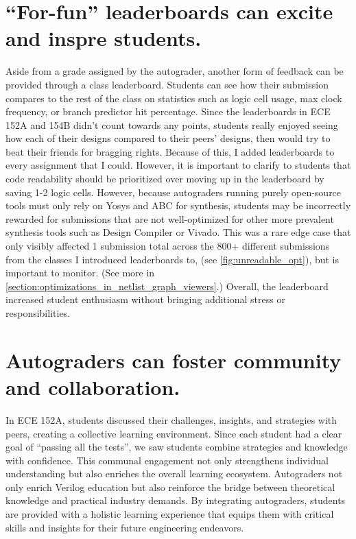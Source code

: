 \section{``For-fun'' leaderboards can excite and inspre students.}
\label{section:leaderboard}



Aside from a grade assigned by the autograder, another form of feedback can be provided through a class leaderboard. Students can see how their submission compares to the rest of the class on statistics such as logic cell usage, max clock frequency, or branch predictor hit percentage. Since the leaderboards in ECE 152A and 154B didn't count towards any points, students really enjoyed seeing how each of their designs compared to their peers' designs, then would try to beat their friends for bragging rights. Because of this, I added leaderboards to every assignment that I could. However, it is important to clarify to students that code readability should be prioritized over moving up in the leaderboard by saving 1-2 logic cells. However, because autograders running purely open-source tools must only rely on Yosys and ABC for synthesis, students may be incorrectly rewarded for submissions that are not well-optimized for other more prevalent synthesis tools such as Design Compiler or Vivado. This was a rare edge case that only visibly affected 1 submission total across the 800+ different submissions from the classes I introduced leaderboards to, (see \autoref{fig:unreadable_opt}), but is important to monitor. (See more in \autoref{section:optimizations_in_netlist_graph_viewers}.) Overall, the leaderboard increased student enthusiasm without bringing additional stress or responsibilities.

\section{Autograders can foster community and collaboration.}

In ECE 152A, students discussed their challenges, insights, and strategies with peers, creating a collective learning environment. Since each student had a clear goal of ``passing all the tests'', we saw students combine strategies and knowledge with confidence. This communal engagement not only strengthens individual understanding but also enriches the overall learning ecosystem. Autograders not only enrich Verilog education but also reinforce the bridge between theoretical knowledge and practical industry demands. By integrating autograders, students are provided with a holistic learning experience that equips them with critical skills and insights for their future engineering endeavors.
